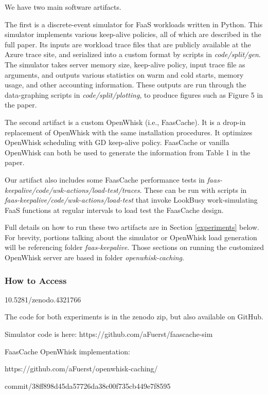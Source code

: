 We have two main software artifacts.

The first is a discrete-event simulator for FaaS workloads written in Python.
This simulator implements various keep-alive policies, all of which are described in the full paper.
Its inputs are workload trace files that are publicly available at the Azure trace site, and serialized into a custom format by scripts in {\em code/split/gen}.
The simulator takes server memory size, keep-alive policy, input trace file as arguments, and outputs various statistics on warm and cold starts, memory usage, and other accounting information. 
These outputs are run through the data-graphing scripts in {\em code/split/plotting}, to produce figures such as Figure 5 in the paper.

The second artifact is a custom OpenWhisk (i.e., FaasCache).
It is a drop-in replacement of OpenWhisk with the same installation procedures.
It optimizes OpenWhisk scheduling with GD keep-alive policy.
FaasCache or vanilla OpenWhisk can both be used to generate the information from Table 1 in the paper.

Our artifact also includes some FaasCache performance tests in {\em faas-keepalive/code/wsk-actions/load-test/traces}.
These can be run with scripts in {\em faas-keepalive/code/wsk-actions/load-test} that invoke LookBusy work-simulating FaaS functions at regular intervals to load test the FaasCache design.

Full details on how to run these two artifacts are in Section \ref{experiments} below.
For brevity, portions talking about the simulator or OpenWhisk load generation will be referencing folder {\em faas-keepalive}.
Those sections on running the customized OpenWhisk server are based in folder {\em openwhisk-caching}.

\subsubsection{How to Access}

10.5281/zenodo.4321766

The code for both experiments is in the zenodo zip, but also available on GitHub. 

\noindent Simulator code is here: https://github.com/aFuerst/faascache-sim

\noindent FaasCache OpenWhisk implementation:

https://github.com/aFuerst/openwhisk-caching/

commit/38ff898d45da57726da38c00f735cb449e7f8595


